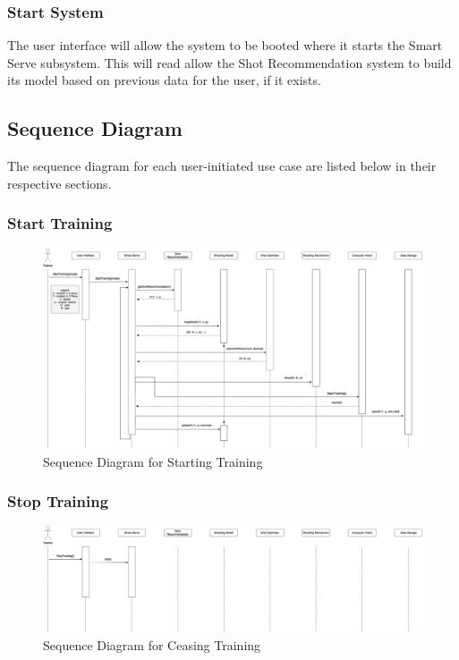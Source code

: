 \documentclass[11pt]{article}
\begin{document}
\subsubsection*{Start System}
The user interface will allow the system to be booted where it starts the Smart Serve subsystem. This will read allow the Shot Recommendation system to build its model based on previous data for the user, if it exists.
\subsection{Sequence Diagram}
The sequence diagram for each user-initiated use case are listed below in their respective sections.
\subsubsection*{Start Training}
\begin{figure}[htbp]
   \centering
   \includegraphics[width=\textwidth]{img/SequenceDiagram-Start.png}
   \caption{Sequence Diagram for Starting Training}
   \label{fig:start}
\end{figure}
\subsubsection*{Stop Training}
\begin{figure}[htbp]
   \centering
   \includegraphics[width=\textwidth]{img/SequenceDiagram-Stop.png}
   \caption{Sequence Diagram for Ceasing Training}
   \label{fig:stop}
\end{figure}
\end{document}
